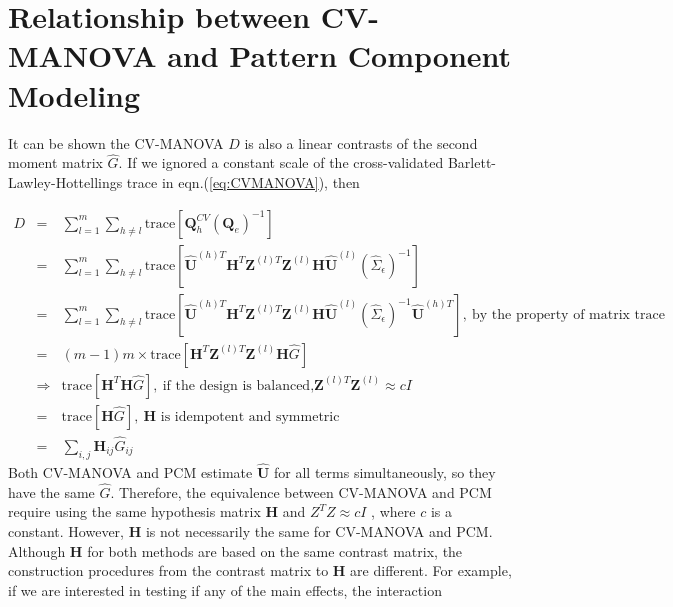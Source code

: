 \documentclass[english]{article}\usepackage[]{graphicx}\usepackage[]{color}
\begin{document}
\section{Relationship between CV-MANOVA and Pattern Component Modeling}

It can be shown the CV-MANOVA $D$ is also a linear contrasts of the
second moment matrix $\hat{G}$. If we ignored a constant scale of
the cross-validated Barlett-Lawley-Hottellings trace in eqn.(\ref{eq:CVMANOVA}),
then

\begin{eqnarray*}
D & = & \sum_{l=1}^{m}\sum_{h\neq l}\text{trace}\left[\boldsymbol{Q}_{h}^{CV}\left(\boldsymbol{Q}_{e}\right)^{-1}\right]\\
 & = & \sum_{l=1}^{m}\sum_{h\neq l}\text{trace}\left[\hat{\boldsymbol{U}}^{(h)T}\boldsymbol{H}^{T}\boldsymbol{Z}^{(l)T}\boldsymbol{Z}^{(l)}\boldsymbol{H}\hat{\boldsymbol{U}}^{(l)}\left(\hat{\Sigma}_{\epsilon}\right)^{-1}\right]\\
 & = & \sum_{l=1}^{m}\sum_{h\neq l}\text{trace}\left[\hat{\boldsymbol{U}}^{(h)T}\boldsymbol{H}^{T}\boldsymbol{Z}^{(l)T}\boldsymbol{Z}^{(l)}\boldsymbol{H}\hat{\boldsymbol{U}}^{(l)}\left(\hat{\Sigma}_{\epsilon}\right)^{-1}\hat{\boldsymbol{U}}^{(h)T}\right],\ \text{by the property of matrix trace}\\
 & = & (m-1)m\times\text{trace}\left[\boldsymbol{H}^{T}\boldsymbol{Z}^{(l)T}\boldsymbol{Z}^{(l)}\boldsymbol{H}\hat{G}\right]\\
 & \Rightarrow & \text{trace}\left[\boldsymbol{H}^{T}\boldsymbol{H}\hat{G}\right],\ \text{if the design is balanced,}\boldsymbol{Z}^{(l)T}\boldsymbol{Z}^{(l)}\approx cI\\
 & = & \text{trace}\left[\boldsymbol{H}\hat{G}\right],\ \boldsymbol{H}\text{ is idempotent and symmetric}\\
 & = & \sum_{i,j}\boldsymbol{H}_{ij}\hat{G}_{ij}
\end{eqnarray*}
Both CV-MANOVA and PCM estimate $\hat{\boldsymbol{U}}$ for all terms
simultaneously, so they have the same $\hat{G}$. Therefore, the equivalence
between CV-MANOVA and PCM require using the same hypothesis matrix
$\boldsymbol{H}$ and $Z^{T}Z\approx cI$ , where $c$ is a constant.
However, $\boldsymbol{H}$ is not necessarily the same for CV-MANOVA
and PCM. Although $\boldsymbol{H}$ for both methods are based on
the same contrast matrix, the construction procedures from the contrast
matrix to $\boldsymbol{H}$ are different. For example, if we are
interested in testing if any of the main effects, the interaction
\end{document}
